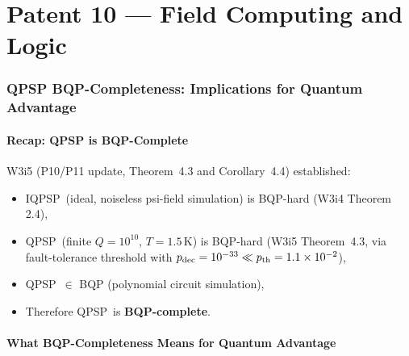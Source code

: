 \documentclass[11pt]{article}
\theoremstyle{definition}
\theoremstyle{remark}
\newcommand{\ee}[1]{\times 10^{#1}}
\newcommand{\QPSP}{\textsc{QPSP}}
\newcommand{\IQPSP}{\textsc{IQPSP}}
\begin{document}

\newpage
\part{Patent 10 --- Field Computing and Logic}

\section{QPSP BQP-Completeness: Implications for Quantum Advantage}
\label{sec:bqp-completeness-implications}

\subsection{Recap: QPSP is BQP-Complete}
\label{sec:bqp-recap}

W3i5 (P10/P11 update, Theorem~4.3 and Corollary~4.4) established:
\begin{itemize}[nosep]
  \item \IQPSP\ (ideal, noiseless psi-field simulation) is BQP-hard
    (W3i4 Theorem 2.4),
  \item \QPSP\ (finite $Q = 10^{10}$, $T = 1.5$\,K) is BQP-hard
    (W3i5 Theorem~4.3, via fault-tolerance threshold with
    $p_{\rm dec} = 10^{-33} \ll p_{\rm th} = 1.1\ee{-2}$),
  \item \QPSP\ $\in$ BQP (polynomial circuit simulation),
  \item Therefore \QPSP\ is \textbf{BQP-complete}.
\end{itemize}

\subsection{What BQP-Completeness Means for Quantum Advantage}
\label{sec:bqp-meaning}
\end{document}
